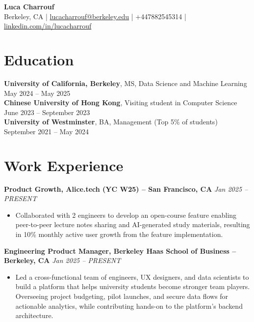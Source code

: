 \documentclass{article}
\begin{document}
\begin{center}
\textbf{\LARGE Luca Charrouf}\\[0.3em]
\small Berkeley, CA | \href{mailto:lucacharrouf@berkeley.edu}{lucacharrouf@berkeley.edu} | +447882545314 | \href{https://linkedin.com/in/lucacharrouf}{linkedin.com/in/lucacharrouf}
\end{center}

\section*{Education}
\textbf{University of California, Berkeley}, MS, Data Science and Machine Learning \hfill May 2024 -- May 2025\\
\textbf{Chinese University of Hong Kong}, Visiting student in Computer Science \hfill June 2023 -- September 2023\\
\textbf{University of Westminster}, BA, Management (Top 5\% of students) \hfill September 2021 -- May 2024

\section*{Work Experience}
\textbf{Product Growth, Alice.tech (YC W25) -- San Francisco, CA} \hfill \textit{Jan 2025 -- PRESENT}
\begin{itemize}[leftmargin=*,noitemsep,topsep=0pt]
    \item Collaborated with 2 engineers to develop an open-course feature enabling peer-to-peer lecture notes sharing and AI-generated study materials, resulting in 10\% monthly active user growth from the feature implementation.
\end{itemize}

\textbf{Engineering Product Manager, Berkeley Haas School of Business -- Berkeley, CA} \hfill \textit{Jan 2025 -- PRESENT}
\begin{itemize}[leftmargin=*,noitemsep,topsep=0pt]
    \item Led a cross-functional team of engineers, UX designers, and data scientists to build a platform that helps university students become stronger team players. Overseeing project budgeting, pilot launches, and secure data flows for actionable analytics, while contributing hands-on to the platform's backend architecture.
\end{itemize}
\end{document}
